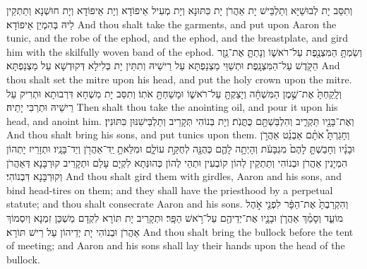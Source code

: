 {וְתִסַּב יָת לְבוּשַׁיָּא וְתַלְבֵּישׁ יָת אַהֲרֹן יָת כִּתּוּנָא וְיָת מְעִיל אֵיפוֹדָא וְיָת אֵיפוֹדָא וְיָת חוּשְׁנָא וְתַתְקֵין לֵיהּ בְּהִמְיַן אֵיפוֹדָא׃}
{And thou shalt take the garments, and put upon Aaron the tunic, and the robe of the ephod, and the ephod, and the breastplate, and gird him with the skilfully woven band of the ephod.}{}
{וְשַׂמְתָּ֥ הַמִּצְנֶ֖פֶת עַל־רֹאשׁ֑וֹ וְנָתַתָּ֛ אֶת־נֵ֥זֶר הַקֹּ֖דֶשׁ עַל־הַמִּצְנָֽפֶת׃
}
{וּתְשַׁוֵּי מַצְנַפְתָּא עַל רֵישֵׁיהּ וְתִתֵּין יָת כְּלִילָא דְּקוּדְשָׁא עַל מַצְנַפְתָּא׃}
{And thou shalt set the mitre upon his head, and put the holy crown upon the mitre.}{}
{וְלָֽקַחְתָּ֙ אֶת־שֶׁ֣מֶן הַמִּשְׁחָ֔ה וְיָצַקְתָּ֖ עַל־רֹאשׁ֑וֹ וּמָשַׁחְתָּ֖ אֹתֽוֹ׃
}
{וְתִסַּב יָת מִשְׁחָא דִּרְבוּתָא וּתְרִיק עַל רֵישֵׁיהּ וּתְרַבִּי יָתֵיהּ׃}
{Then shalt thou take the anointing oil, and pour it upon his head, and anoint him.}{}
{וְאֶת־בָּנָ֖יו תַּקְרִ֑יב וְהִלְבַּשְׁתָּ֖ם כֻּתֳּנֹֽת׃}
{וְיָת בְּנוֹהִי תְּקָרֵיב וְתַלְבֵּישִׁנּוּן כִּתּוּנִין׃}
{And thou shalt bring his sons, and put tunics upon them.}{}
{וְחָגַרְתָּ֩ אֹתָ֨ם אַבְנֵ֜ט אַהֲרֹ֣ן וּבָנָ֗יו וְחָבַשְׁתָּ֤ לָהֶם֙ מִגְבָּעֹ֔ת וְהָיְתָ֥ה לָהֶ֛ם כְּהֻנָּ֖ה לְחֻקַּ֣ת עוֹלָ֑ם וּמִלֵּאתָ֥ יַֽד־אַהֲרֹ֖ן וְיַד־בָּנָֽיו׃
}
{וּתְזָרֵיז יָתְהוֹן הִמְיָנִין אַהֲרֹן וּבְנוֹהִי וְתַתְקֵין לְהוֹן קוֹבְעִין וּתְהֵי לְהוֹן כְּהוּנְּתָא לִקְיָם עָלַם וּתְקָרֵיב קוּרְבָּנָא דְּאַהֲרֹן וְקוּרְבָּנָא דִּבְנוֹהִי׃}
{And thou shalt gird them with girdles, Aaron and his sons, and bind head-tires on them; and they shall have the priesthood by a perpetual statute; and thou shalt consecrate Aaron and his sons.}{}
{וְהִקְרַבְתָּ֙ אֶת־הַפָּ֔ר לִפְנֵ֖י אֹ֣הֶל מוֹעֵ֑ד וְסָמַ֨ךְ אַהֲרֹ֧ן וּבָנָ֛יו אֶת־יְדֵיהֶ֖ם עַל־רֹ֥אשׁ הַפָּֽר׃}
{וּתְקָרֵיב יָת תּוֹרָא לִקְדָם מַשְׁכַּן זִמְנָא וְיִסְמוֹךְ אַהֲרֹן וּבְנוֹהִי יָת יְדֵיהוֹן עַל רֵישׁ תּוֹרָא׃}
{And thou shalt bring the bullock before the tent of meeting; and Aaron and his sons shall lay their hands upon the head of the bullock.}{}
